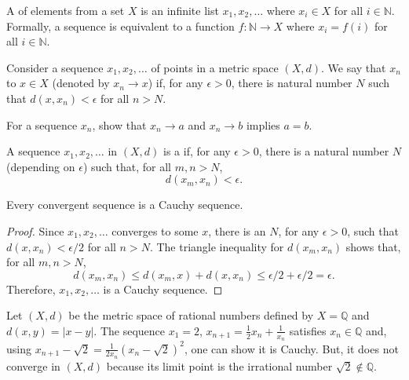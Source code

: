 \begin{definition}
A  of elements from a set $X$ is an infinite list $x_1,x_2,\ldots$ where $x_i \in X$ for all $i\in \mathbb{N}$.
Formally, a sequence is equivalent to a function $f \colon \mathbb{N} \rightarrow X$ where $x_i = f(i)$ for all $i\in \mathbb{N}$.
\end{definition}

\begin{definition}
\label{definition_metspace_converge}
Consider a sequence $x_1, x_2, \ldots$ of points in a metric space $(X,d)$.
We say that $x_n$  to $x\in X$ (denoted by $x_n \to x$)  if, for any $\epsilon >0$, there is natural number $N$ such that $d(x,x_n) < \epsilon$ for all $n>N$.
\end{definition}

\begin{problem}
For a sequence $x_n$, show that $x_n \to a$ and $x_n \to b$ implies $a=b$.
\end{problem}

\begin{definition}
A sequence $x_1,x_2,\ldots$ in $(X,d)$ is a  if, for any $\epsilon >0$, there is a natural number $N$ (depending on $\epsilon$) such that, for all $m,n > N$,
\begin{equation*}
d \left( x_m, x_n \right) < \epsilon.
\end{equation*}
\end{definition}



\begin{theorem}
Every convergent sequence is a Cauchy sequence.
\end{theorem}
\begin{proof}
Since $x_1,x_2,\ldots$ converges to some $x$, there is an $N$, for any $\epsilon>0$, such that $d(x,x_n)<\epsilon /2$ for all $n>N$.
The triangle inequality for $d(x_m,x_n)$ shows that, for all $m,n>N$,
\[ d(x_m,x_n)\leq d(x_m,x) + d(x,x_n) \leq \epsilon/2 + \epsilon/2 = \epsilon. \]
Therefore, $x_1,x_2,\ldots$ is a Cauchy sequence.
\end{proof}

\begin{example}
Let $(X,d)$ be the metric space  of rational numbers defined by $X=\mathbb{Q}$ and $d(x,y)=|x-y|$.
The sequence $x_1 = 2$, $x_{n+1} = \frac{1}{2}x_n + \frac{1}{x_n}$ satisfies $x_n \in \mathbb{Q} $ and, using $x_{n+1} - \sqrt{2} = \frac{1}{2x_n}(x_n-\sqrt{2})^2$, one can show it is Cauchy. But, it does not converge in $(X,d)$ because its limit point is the irrational number $\sqrt{2} \notin \mathbb{Q}$.
\end{example}

